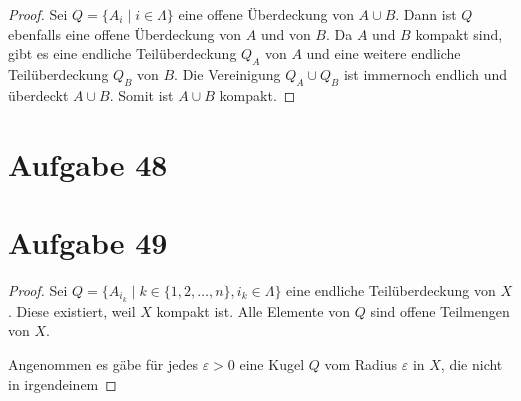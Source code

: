 \documentclass[10pt,a4paper]{article}
\begin{document}
\begin{proof}
  Sei $Q = \{ A_{i} \mid i \in \Lambda \}$ eine offene Überdeckung von $A \cup B$.
  Dann ist $Q$ ebenfalls eine offene Überdeckung von $A$ und von $B$.
  Da $A$ und $B$ kompakt sind, gibt es eine endliche Teilüberdeckung $Q_{A}$ von $A$ und eine weitere endliche Teilüberdeckung $Q_{B}$ von $B$.
  Die Vereinigung $Q_{A} \cup Q_{B}$ ist immernoch endlich und überdeckt $A \cup B$.
  Somit ist $A \cup B$ kompakt.
\end{proof}

\section{Aufgabe 48}

\section{Aufgabe 49}

\begin{proof}
  Sei $Q = \{ A_{i_{k}} \mid k \in \{ 1, 2, \dots, n \}, i_{k} \in \Lambda \}$ eine endliche Teilüberdeckung von $X$.
  Diese existiert, weil $X$ kompakt ist.
  Alle Elemente von $Q$ sind offene Teilmengen von $X$.

  Angenommen es gäbe für jedes $\varepsilon > 0$ eine Kugel $Q$ vom Radius $\varepsilon$ in $X$, die nicht in irgendeinem
\end{proof}
\end{document}
